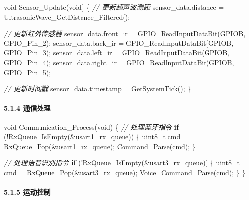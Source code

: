 \documentclass[
]{article}
\newenvironment{Shaded}{}{}
\newcommand{\CommentTok}[1]{\textcolor[rgb]{0.38,0.63,0.69}{\textit{#1}}}
\newcommand{\ControlFlowTok}[1]{\textcolor[rgb]{0.00,0.44,0.13}{\textbf{#1}}}
\newcommand{\DataTypeTok}[1]{\textcolor[rgb]{0.56,0.13,0.00}{#1}}
\newcommand{\NormalTok}[1]{#1}
\begin{document}
\begin{Shaded}
\begin{Highlighting}[]
\DataTypeTok{void}\NormalTok{ Sensor\_Update(}\DataTypeTok{void}\NormalTok{)}
\NormalTok{\{}
    \CommentTok{// 更新超声波测距}
\NormalTok{    sensor\_data.distance = UltrasonicWave\_GetDistance\_Filtered();}
    
    \CommentTok{// 更新红外传感器}
\NormalTok{    sensor\_data.front\_ir = GPIO\_ReadInputDataBit(GPIOB, GPIO\_Pin\_2);}
\NormalTok{    sensor\_data.back\_ir = GPIO\_ReadInputDataBit(GPIOB, GPIO\_Pin\_3);}
\NormalTok{    sensor\_data.left\_ir = GPIO\_ReadInputDataBit(GPIOB, GPIO\_Pin\_4);}
\NormalTok{    sensor\_data.right\_ir = GPIO\_ReadInputDataBit(GPIOB, GPIO\_Pin\_5);}
    
    \CommentTok{// 更新时间戳}
\NormalTok{    sensor\_data.timestamp = GetSystemTick();}
\NormalTok{\}}
\end{Highlighting}
\end{Shaded}

\hypertarget{ux901aux4fe1ux5904ux7406}{%
\paragraph{5.1.4 通信处理}\label{ux901aux4fe1ux5904ux7406}}

\begin{Shaded}
\begin{Highlighting}[]
\DataTypeTok{void}\NormalTok{ Communication\_Process(}\DataTypeTok{void}\NormalTok{)}
\NormalTok{\{}
    \CommentTok{// 处理蓝牙指令}
    \ControlFlowTok{if}\NormalTok{ (!RxQueue\_IsEmpty(\&usart1\_rx\_queue)) \{}
        \DataTypeTok{uint8\_t}\NormalTok{ cmd = RxQueue\_Pop(\&usart1\_rx\_queue);}
\NormalTok{        Command\_Parse(cmd);}
\NormalTok{    \}}
    
    \CommentTok{// 处理语音识别指令}
    \ControlFlowTok{if}\NormalTok{ (!RxQueue\_IsEmpty(\&usart3\_rx\_queue)) \{}
        \DataTypeTok{uint8\_t}\NormalTok{ cmd = RxQueue\_Pop(\&usart3\_rx\_queue);}
\NormalTok{        Voice\_Command\_Parse(cmd);}
\NormalTok{    \}}
\NormalTok{\}}
\end{Highlighting}
\end{Shaded}

\hypertarget{ux8fd0ux52a8ux63a7ux5236}{%
\paragraph{5.1.5 运动控制}\label{ux8fd0ux52a8ux63a7ux5236}}
\end{document}
